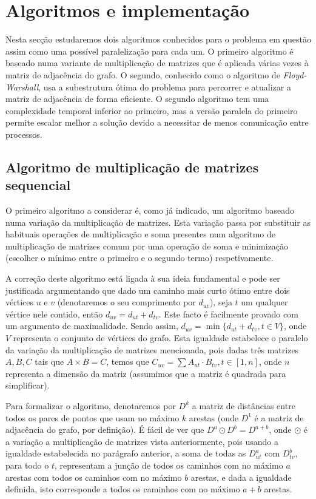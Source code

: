 \documentclass[10pt,a4paper,oneside]{article}
\begin{document}
\section{Algoritmos e implementação}
\label{sec:ai}
Nesta secção estudaremos dois algoritmos conhecidos para o problema em
questão assim como uma possível paralelização para cada um. O primeiro
algoritmo é baseado numa variante de multiplicação de matrizes que é
aplicada várias vezes à matriz de adjacência do grafo. O segundo,
conhecido como o algoritmo de \textit{Floyd-Warshall}, usa a
subestrutura ótima do problema para percorrer e atualizar a matriz de
adjacência de forma eficiente. O segundo algoritmo tem uma
complexidade temporal inferior ao primeiro, mas a versão paralela do
primeiro permite escalar melhor a solução devido a necessitar de menos
comunicação entre processos.

\subsection{Algoritmo de multiplicação de matrizes sequencial}
O primeiro algoritmo a considerar é, como já indicado, um algoritmo
baseado numa variação da multiplicação de matrizes. Esta variação
passa por substituir as habituais operações de multiplicação e soma
presentes num algoritmo de multiplicação de matrizes comum por uma
operação de soma e minimização (escolher o mínimo entre o primeiro e o
segundo termo) respetivamente.

A correção deste algoritmo está ligada à sua ideia fundamental e pode
ser justificada argumentando que dado um caminho mais curto ótimo
entre dois vértices $u$ e $v$ (denotaremos o seu comprimento por
$d_{uv}$), seja $t$ um qualquer vértice nele contido, então $d_{uv} =
d_{ut} + d_{tv}$. Este facto é facilmente provado com um argumento de
maximalidade. Sendo assim, $d_{uv} = \min{\{d_{ut} + d_{tv}, t \in
  V\}}$, onde $V$ representa o conjunto de vértices do grafo. Esta
igualdade estabelece o paralelo da variação da multiplicação de
matrizes mencionada, pois dadas três matrizes $A, B, C$ tais que $A
\times B = C$, temos que $C_{uv} = \sum{A_{ut} \cdot B_{tv}}, t \in
       [1, n]$, onde $n$ representa a dimensão da matriz (assumimos
       que a matriz é quadrada para simplificar).

Para formalizar o algoritmo, denotaremos por $D^k$ a matriz de
distâncias entre todos os pares de pontos que usam no máximo $k$
arestas (onde $D^1$ é a matriz de adjacência do grafo, por
definição). É fácil de ver que $D^a \odot D^b = D^{a + b}$, onde
$\odot$ é a variação a multiplicação de matrizes vista anteriormente,
pois usando a igualdade estabelecida no parágrafo anterior, a soma de
todas as $D^a_{ut}$ com $D^b_{tv}$, para todo o $t$, representam a
junção de todos os caminhos com no máximo $a$ arestas com todos os
caminhos com no máximo $b$ arestas, e dada a igualdade definida, isto
corresponde a todos os caminhos com no máximo $a+b$ arestas.
\end{document}
